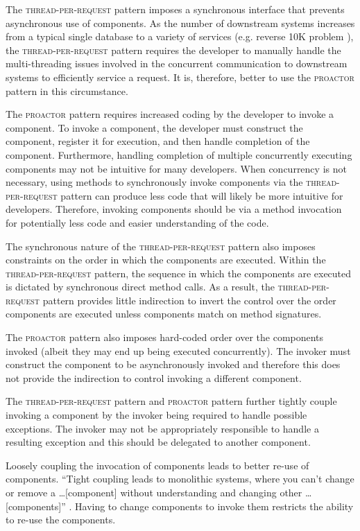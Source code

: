 \documentclass[prodmode]{style/acmlarge}
\begin{document}
The \textsc{thread-per-request} pattern imposes a synchronous interface that
prevents asynchronous use of components.  As the number of downstream systems
increases from a typical single database to a variety of services (e.g.
reverse 10K problem \cite{reverse-ten-k-problem}), the
\textsc{thread-per-request} pattern requires the developer to manually handle
the multi-threading issues involved in the concurrent communication to
downstream systems to efficiently service a request.  It is, therefore, better
to use the \textsc{proactor} pattern in this circumstance.

The \textsc{proactor} pattern requires increased coding by the developer to
invoke a component.  To invoke a component, the developer must construct the
component, register it for execution, and then handle completion of the
component.  Furthermore, handling completion of multiple concurrently executing
components may not be intuitive for many developers.  When concurrency is not
necessary, using methods to synchronously invoke components via the
\textsc{thread-per-request} pattern can produce less code that will likely be
more intuitive for developers.  Therefore, invoking components should be via a
method invocation for potentially less code and easier understanding of the
code.

The synchronous nature of the \textsc{thread-per-request} pattern also imposes
constraints on the order in which the components are executed.  Within the
\textsc{thread-per-request} pattern, the sequence in which the components are
executed is dictated by synchronous direct method calls.  As a result, the
\textsc{thread-per-request} pattern provides little indirection to invert the
control over the order components are executed unless components match on method
signatures.

The \textsc{proactor} pattern also imposes hard-coded order over the components
invoked (albeit they may end up being executed concurrently).  The invoker must
construct the component to be asynchronously invoked and therefore this does not
provide the indirection to control invoking a different component.

The \textsc{thread-per-request} pattern and \textsc{proactor} pattern further
tightly couple invoking a component by the invoker being required to handle
possible exceptions.  The invoker may not be appropriately responsible to handle
a resulting exception and this should be delegated to another component.

Loosely coupling the invocation of components leads to better re-use of
components.  ``Tight coupling leads to monolithic systems, where you can't
change or remove a \ldots [component] without understanding and changing other
\ldots [components]'' \cite[p. 24-25]{gof}.  Having to change components to
invoke them restricts the ability to re-use the components.
\end{document}
